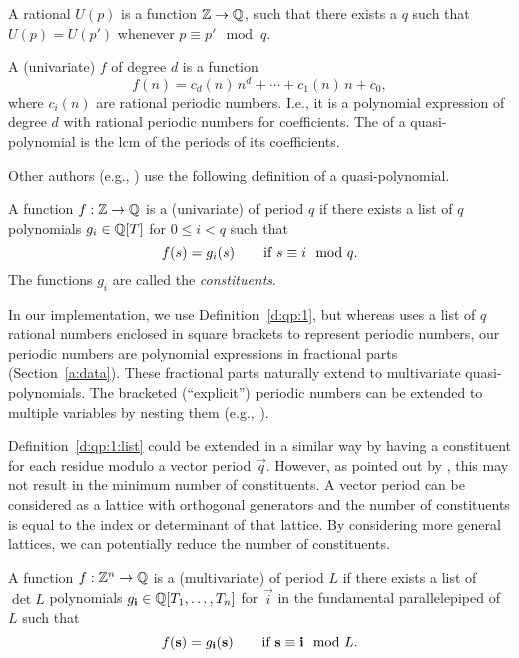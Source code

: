 \begin{definition}
\label{d:periodic:1}
A rational  $U(p)$
is a function $\mathbb{Z} \to \mathbb{Q}$,
such that there exists a  $q$
such that $U(p) = U(p')$ whenever $p \equiv p' \mod q$.
\end{definition}

\begin{definition}
\label{d:qp:1}
A (univariate)
\/ $f$ of degree $d$ is
a function
$$
f(n) = c_d(n) \, n^d + \cdots + c_1(n) \, n + c_0
,
$$
where $c_i(n)$ are rational periodic numbers.
I.e., it is a polynomial expression of degree $d$ 
with rational periodic numbers for coefficients.
The  of a quasi-polynomial is the \ac{lcm}
of the periods of its coefficients.
\end{definition}

Other authors (e.g., )
use the following definition of a quasi-polynomial.
\begin{definition}
\label{d:qp:1:list}
A function $f : \mathbb{Z} \to \mathbb{Q}$ is
a (univariate)  of period $q$ if there
exists a list of $q$ polynomials $g_i \in \mathbb{Q}[T]$ for $0 \le i < q$ such
that
\[
f (s) = g_i(s) \qquad \hbox{if $s \equiv i \mod {q}$}
.
\]
The functions $g_i$ are called the {\em constituents}.
\end{definition}

In our implementation, we use Definition~\ref{d:qp:1},
but whereas
 uses a list of $q$ rational
numbers enclosed in square brackets to represent periodic
numbers, our periodic numbers are polynomial expressions
in fractional parts (Section~\ref{a:data}).
These fractional parts naturally extend to multivariate
quasi-polynomials.
The bracketed (``explicit'') periodic numbers can
be extended to multiple variables by nesting them
(e.g., ).

Definition~\ref{d:qp:1:list} could be extended in a similar way
by having a constituent for each residue modulo a vector period $\vec q$.
However, as pointed out by , this may not result
in the minimum number of constituents.
A vector period can be considered as a lattice with orthogonal generators and
the number of constituents is equal to the index or determinant of that lattice.
By considering more general lattices, we can potentially reduce the number
of constituents.
\begin{definition}
\label{d:qp}
A function $f : \mathbb{Z}^n \to \mathbb{Q}$ is
a (multivariate)  of period $L$ if there
exists a list of $\det L$ polynomials $g_{\vec i} \in \QQ[T_1,\ldots,T_n]$
for $\vec i$ in the fundamental parallelepiped of $L$ such
that
\[
f (\vec s) = g_{\vec i}(\vec s) \qquad \hbox{if $\vec s \equiv \vec i \mod L$}
.
\]
\end{definition}


